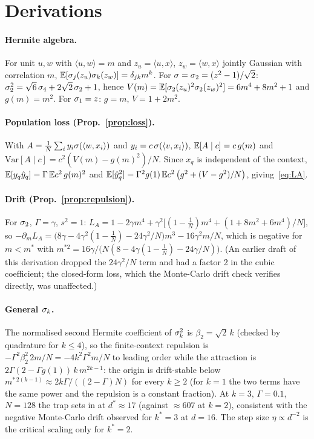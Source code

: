 \appendix
\section{Derivations}
\label{app:deriv}

\paragraph{Hermite algebra.} For unit $u,w$ with $\langle u,w\rangle=m$ and $z_u=\langle u,x\rangle$, $z_w=\langle w,x\rangle$ jointly Gaussian with
correlation $m$, $\mathbb{E}[\sigma_j(z_u)\sigma_k(z_w)]=\delta_{jk}m^k$. For $\sigma=\sigma_2=(z^2-1)/\sqrt2$: $\sigma_2^2=\sqrt6\,\sigma_4+2\sqrt2\,\sigma_2+1$, hence
$V(m)=\mathbb{E}[\sigma_2(z_u)^2\sigma_2(z_w)^2]=6m^4+8m^2+1$ and $g(m)=m^2$. For $\sigma_1=z$: $g=m$, $V=1+2m^2$.

\paragraph{Population loss (Prop.~\ref{prop:loss}).} With $A=\frac1N\sum_iy_i\sigma(\langle w,x_i\rangle)$ and $y_i=c\,\sigma(\langle v,x_i\rangle)$,
$\mathbb{E}[A\mid c]=c\,g(m)$ and $\mathrm{Var}[A\mid c]=c^2(V(m)-g(m)^2)/N$. Since $x_q$ is independent of the context,
$\mathbb{E}[y_q\hat y_q]=\Gamma\,\mathbb{E} c^2\,g(m)^2$ and $\mathbb{E}[\hat y_q^2]=\Gamma^2g(1)\,\mathbb{E} c^2\,\big(g^2+(V-g^2)/N\big)$, giving~\eqref{eq:LA}.

\paragraph{Drift (Prop.~\ref{prop:repulsion}).} For $\sigma_2$, $\Gamma=\gamma$, $s^2=1$:
$L_A=1-2\gamma m^4+\gamma^2\big[(1-\tfrac1N)m^4+(1+8m^2+6m^4)/N\big]$, so
$-\partial_mL_A=\big(8\gamma-4\gamma^2(1-\tfrac1N)-24\gamma^2/N\big)m^3-16\gamma^2m/N$, which is negative for $m<m^*$ with
$m^{*2}=16\gamma/\big(N(8-4\gamma(1-\tfrac1N)-24\gamma/N)\big)$. (An earlier draft of this derivation dropped the $24\gamma^2/N$ term and
had a factor 2 in the cubic coefficient; the closed-form loss, which the Monte-Carlo drift check verifies directly, was unaffected.)

\paragraph{General $\sigma_k$.} The normalised second Hermite coefficient of $\sigma_k^2$ is $\beta_2=\sqrt2\,k$ (checked by quadrature for
$k\le4$), so the finite-context repulsion is $-\Gamma^2\beta_2^2\,2m/N=-4k^2\Gamma^2m/N$ to leading order while the attraction is
$2\Gamma(2-\Gamma g(1))\,k\,m^{2k-1}$: the origin is drift-stable below $m^{*\,2(k-1)}\approx2k\Gamma/((2-\Gamma)N)$ for every $k\ge2$ (for $k=1$ the two
terms have the same power and the repulsion is a constant fraction). At $k=3$, $\Gamma=0.1$, $N=128$ the trap sets in at $d^*\approx17$
(against $\approx607$ at $k=2$), consistent with the negative Monte-Carlo drift observed for $k^*=3$ at $d=16$. The step size $\eta\propto d^{-2}$ is
the critical scaling only for $k^*=2$.


